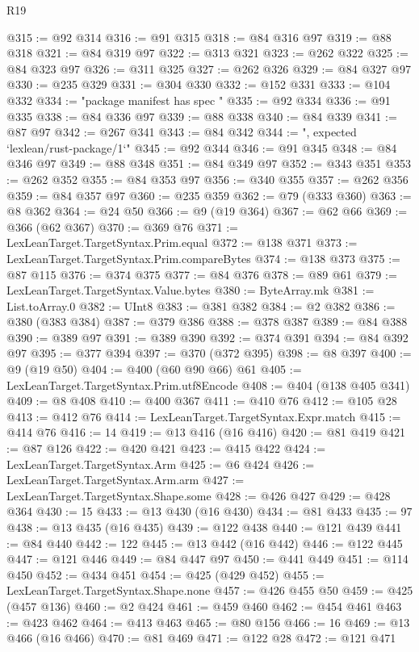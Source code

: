 \begin{lexlean}{R19}
\begin{coremodule}
{{{{{{{{{{{{{{{{{{{{{{{{{{{{{{{{{{{{{{{{{{{{{{{{{{{{{{{{{{{{{{{{{{{{{{{{{{{{{{{{{{{{{{{@315 := @92 @314
@316 := @91 @315
@318 := @84 @316 @97
@319 := @88 @318
@321 := @84 @319 @97
@322 := @313 @321
@323 := @262 @322
@325 := @84 @323 @97
@326 := @311 @325
@327 := @262 @326
@329 := @84 @327 @97
@330 := @235 @329
@331 := @304 @330
@332 := @152 @331
@333 := @104 @332
@334 := "package manifest has spec "
@335 := @92 @334
@336 := @91 @335
@338 := @84 @336 @97
@339 := @88 @338
@340 := @84 @339
@341 := @87 @97
@342 := @267 @341
@343 := @84 @342
@344 := ", expected `lexlean/rust-package/1`"
@345 := @92 @344
@346 := @91 @345
@348 := @84 @346 @97
@349 := @88 @348
@351 := @84 @349 @97
@352 := @343 @351
@353 := @262 @352
@355 := @84 @353 @97
@356 := @340 @355
@357 := @262 @356
@359 := @84 @357 @97
@360 := @235 @359
@362 := @79 (@333 @360)
@363 := @8 @362
@364 := @24 @50
@366 := @9 (@19 @364)
@367 := @62 @66
@369 := @366 (@62 @367)
@370 := @369 @76
@371 := LexLeanTarget.TargetSyntax.Prim.equal
@372 := @138 @371
@373 := LexLeanTarget.TargetSyntax.Prim.compareBytes
@374 := @138 @373
@375 := @87 @115
@376 := @374 @375
@377 := @84 @376
@378 := @89 @61
@379 := LexLeanTarget.TargetSyntax.Value.bytes
@380 := ByteArray.mk
@381 := List.toArray.{0}
@382 := UInt8
@383 := @381 @382
@384 := @2 @382
@386 := @380 (@383 @384)
@387 := @379 @386
@388 := @378 @387
@389 := @84 @388
@390 := @389 @97
@391 := @389 @390
@392 := @374 @391
@394 := @84 @392 @97
@395 := @377 @394
@397 := @370 (@372 @395)
@398 := @8 @397
@400 := @9 (@19 @50)
@404 := @400 (@60 @90 @66) @61
@405 := LexLeanTarget.TargetSyntax.Prim.utf8Encode
@408 := @404 (@138 @405 @341)
@409 := @8 @408
@410 := @400 @367
@411 := @410 @76
@412 := @105 @28
@413 := @412 @76
@414 := LexLeanTarget.TargetSyntax.Expr.match
@415 := @414 @76
@416 := 14
@419 := @13 @416 (@16 @416)
@420 := @81 @419
@421 := @87 @126
@422 := @420 @421
@423 := @415 @422
@424 := LexLeanTarget.TargetSyntax.Arm
@425 := @6 @424
@426 := LexLeanTarget.TargetSyntax.Arm.arm
@427 := LexLeanTarget.TargetSyntax.Shape.some
@428 := @426 @427
@429 := @428 @364
@430 := 15
@433 := @13 @430 (@16 @430)
@434 := @81 @433
@435 := 97
@438 := @13 @435 (@16 @435)
@439 := @122 @438
@440 := @121 @439
@441 := @84 @440
@442 := 122
@445 := @13 @442 (@16 @442)
@446 := @122 @445
@447 := @121 @446
@449 := @84 @447 @97
@450 := @441 @449
@451 := @114 @450
@452 := @434 @451
@454 := @425 (@429 @452)
@455 := LexLeanTarget.TargetSyntax.Shape.none
@457 := @426 @455 @50
@459 := @425 (@457 @136)
@460 := @2 @424
@461 := @459 @460
@462 := @454 @461
@463 := @423 @462
@464 := @413 @463
@465 := @80 @156
@466 := 16
@469 := @13 @466 (@16 @466)
@470 := @81 @469
@471 := @122 @28
@472 := @121 @471
}}}}}}}}}}}}}}}}}}}}}}}}}}}}}}}}}}}}}}}}}}}}}}}}}}}}}}}}}}}}}}}}}}}}}}}}}}}}}}}}}}}}}}}
\end{coremodule}
\end{lexlean}
